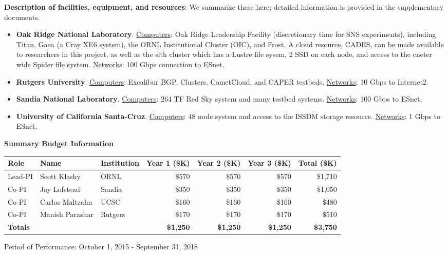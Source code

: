 \vspace{2ex}

\noindent
{\bf Description of facilities, equipment, and resources}: We summarize these here; detailed information is provided in the supplementary documents.
\begin{itemize}[itemsep=1pt,topsep=2pt]
\item
{\bf Oak Ridge National Laboratory}. \underline{Computers}:
Oak Ridge Leadership Facility (discretionary time for SNS experiments), including
Titan, Gaea (a Cray XE6 system), the ORNL Institutional Cluster (OIC),
and Frost. A cloud resource, CADES, can be made available to
researchers in this project, as well as the sith cluster which has a Lustre file
sysem, 2 SSD on each node, and access to the cneter wide Spider file system.
 \underline{Networks}: 100 Gbps connection to ESnet.
\vspace{-1ex}
\item
{\bf Rutgers University}. \underline{Computers}: Excalibur BGP, Clusters, CometCloud, and CAPER testbeds. \underline{Networks}: 10 Gbps to Internet2.
\vspace{-1ex}
\item
{\bf Sandia National Laboratory}.
\underline{Computers}: 264 TF Red Sky system and many testbed systems.
\underline{Networks}: 100 Gbps to ESnet.
\item
{\bf University of California Santa-Cruz}.
\underline{Computers}:  48 node system and access to the ISSDM storage resource.
\underline{Networks}: 1 Gbps to ESnet.
\end{itemize}

\begin{center}
\textbf{\large Summary Budget Information}
\medskip
\begin{tabular}{| l | l | l | r | r | r | r |} \hline
Role & Name & Institution & Year 1 (\$K) & Year 2 (\$K) &   Year 3 (\$K) & Total (\$K) \\
\hline
Lead-PI & Scott Klasky & ORNL & {\$}570 &  {\$}570 &  {\$}570 &   {\$}1,710\\
Co-PI & Jay Lofstead & Sandia  &  {\$}350 &  {\$}350 &  {\$}350 &  {\$}1,050 \\
Co-PI & Carlos  Maltzahn & UCSC  &  {\$}160 &  {\$}160 &  {\$}160 &  {\$}480 \\
Co-PI & Manish Parashar & Rutgers &  {\$}170 &  {\$}170 &  {\$}170 &  {\$}510  \\
\hline
{\bf Totals}  & & & {\bf  {\$}1,250} & {\bf  {\$}1,250} & {\bf  {\$}1,250} & {\bf  {\$}3,750}\\
\hline
\end{tabular}
\end{center}

\noindent
{Period of Performance: October 1, 2015 - September 31, 2018}\\
\noindent
\vfill

